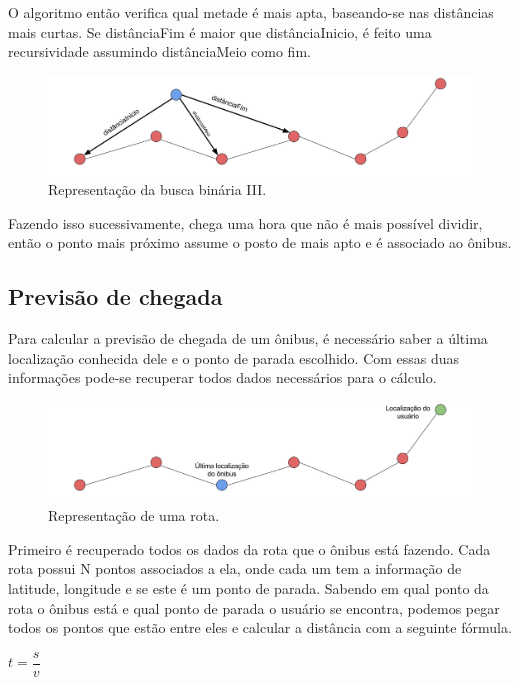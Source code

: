 \documentclass[
	12pt,				%
	oneside,			%
	a4paper,			%
	brazil				%
]{abntex2}
\begin{document}
{O algoritmo então verifica qual metade é mais apta, baseando-se nas distâncias mais curtas. Se distânciaFim é maior que distânciaInicio, é feito uma recursividade assumindo distânciaMeio como fim.

\begin{figure}[H]
\centering
\includegraphics[width=12cm, center]{images/nova-distancia.png}
\caption{Representação da busca binária III.}
\label{Rotulo}
\end{figure}

Fazendo isso sucessivamente, chega uma hora que não é mais possível dividir, então o ponto mais próximo assume o posto de mais apto e é associado ao ônibus.

\subsection{Previsão de chegada}

Para calcular a previsão de chegada de um ônibus, é necessário saber a última localização conhecida dele e o ponto de parada escolhido. Com essas duas informações pode-se recuperar todos dados necessários para o cálculo.

\begin{figure}[H]
\centering
\includegraphics[width=15cm, center]{images/previsao-rota}
\caption{Representação de uma rota.}
\label{Rotulo}
\end{figure}

Primeiro é recuperado todos os dados da rota que o ônibus está fazendo. Cada rota possui N pontos associados a ela, onde cada um tem a informação de latitude, longitude e se este é um ponto de parada. Sabendo em qual ponto da rota o ônibus está e qual ponto de parada o usuário se encontra, podemos pegar todos os pontos que estão entre eles e calcular a distância com a seguinte fórmula.

\begin{center}
$t = \dfrac{s}{v}$ 
\end{center}

}
\end{document}
